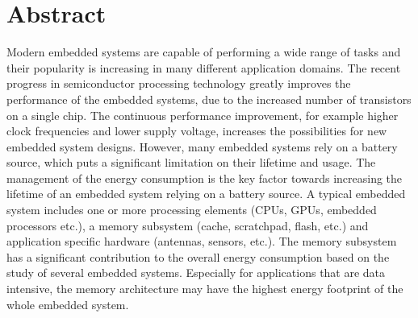 \section*{\hspace*{\fill} Abstract \hspace*{\fill}}

Modern embedded systems are capable of performing a wide range of tasks and their popularity is increasing in many different application domains.
The recent progress in semiconductor processing technology greatly improves the performance of the embedded systems, due to the increased number of transistors on a single chip.
The continuous performance improvement, for example higher clock frequencies and lower supply voltage, increases the possibilities for new embedded system designs.
However, many embedded systems rely on a battery source, which puts a significant limitation on their lifetime and usage.
The management of the energy consumption is the key factor towards increasing the lifetime of an embedded system relying on a battery source.
A typical embedded system includes one or more processing elements (CPUs, GPUs, embedded processors etc.), a memory subsystem (cache, scratchpad, flash, etc.) and application specific hardware (antennas, sensors, etc.). 
The memory subsystem has a significant contribution to the overall energy consumption based on the study of several embedded systems.
Especially for applications that are data intensive, the memory architecture may have the highest energy footprint of the whole embedded system.

